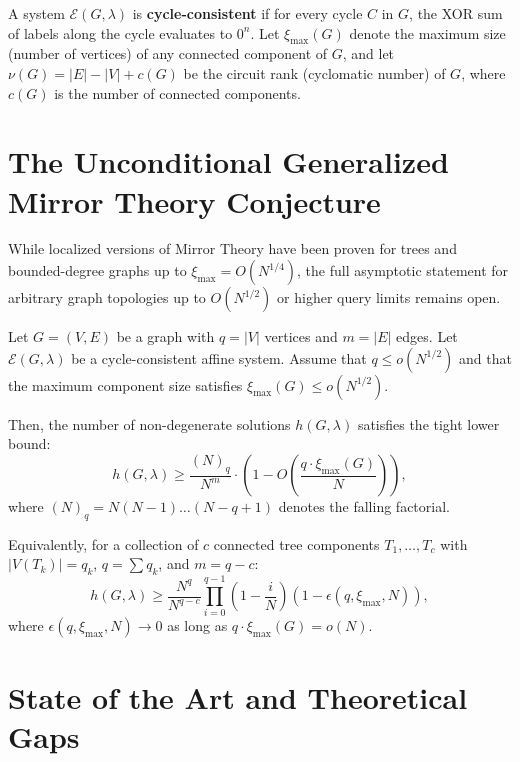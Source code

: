 \documentclass{aicr-conjecture}
\begin{document}
\begin{definition}
A system $\mathcal{E}(G, \lambda)$ is \textbf{cycle-consistent} if for every cycle $C$ in $G$, the XOR sum of labels along the cycle evaluates to $0^n$. Let $\xi_{\max}(G)$ denote the maximum size (number of vertices) of any connected component of $G$, and let $\nu(G) = |E| - |V| + c(G)$ be the circuit rank (cyclomatic number) of $G$, where $c(G)$ is the number of connected components.
\end{definition}

\section{The Unconditional Generalized Mirror Theory Conjecture}

While localized versions of Mirror Theory have been proven for trees and bounded-degree graphs up to $\xi_{\max} = O(N^{1/4})$, the full asymptotic statement for arbitrary graph topologies up to $O(N^{1/2})$ or higher query limits remains open.

\begin{conjecture}
Let $G = (V, E)$ be a graph with $q = |V|$ vertices and $m = |E|$ edges. Let $\mathcal{E}(G, \lambda)$ be a cycle-consistent affine system. Assume that $q \le o(N^{1/2})$ and that the maximum component size satisfies $\xi_{\max}(G) \le o(N^{1/2})$.

Then, the number of non-degenerate solutions $h(G, \lambda)$ satisfies the tight lower bound:
\begin{equation}
h(G, \lambda) \ge \frac{(N)_{q}}{N^m} \cdot \left( 1 - O\left( \frac{q \cdot \xi_{\max}(G)}{N} \right) \right),
\end{equation}
where $(N)_q = N(N-1)\dots(N-q+1)$ denotes the falling factorial.

Equivalently, for a collection of $c$ connected tree components $T_1, \dots, T_c$ with $|V(T_k)| = q_k$, $q = \sum q_k$, and $m = q - c$:
\begin{equation}
h(G, \lambda) \ge \frac{N^q}{N^{q-c}} \prod_{i=0}^{q-1} \left(1 - \frac{i}{N}\right) \left( 1 - \epsilon(q, \xi_{\max}, N) \right),
\end{equation}
where $\epsilon(q, \xi_{\max}, N) \to 0$ as long as $q \cdot \xi_{\max}(G) = o(N)$.
\end{conjecture}

\section{State of the Art and Theoretical Gaps}
\end{document}
